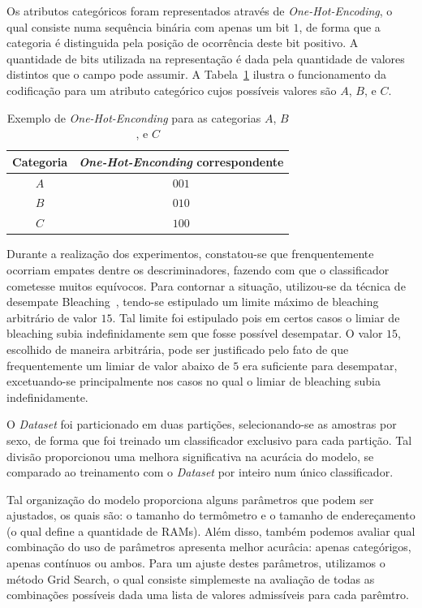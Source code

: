 \documentclass[12pt]{article}
\begin{document}
Os atributos categóricos foram representados através de \emph{One-Hot-Encoding}, o qual consiste numa sequência binária com apenas um bit $1$, de forma que a categoria é distinguida pela posição de ocorrência deste bit positivo. A quantidade de bits utilizada na representação é dada pela quantidade de valores distintos que o campo pode assumir. A Tabela~\ref{tab:onehot} ilustra o funcionamento da codificação para um atributo categórico cujos possíveis valores são $A$, $B$, e $C$.

\begin{table}
\centering
 \begin{tabular}{cc} 
 Categoria & \emph{One-Hot-Enconding} correspondente \\ \hline
 $A$ & $001$ \\
 $B$ & $010$ \\
 $C$ & $100$ \\
 \end{tabular}
  \caption{Exemplo de \emph{One-Hot-Enconding} para as categorias $A$, $B$, e $C$} \label{tab:onehot}
\end{table}

Durante a realização dos experimentos, constatou-se que frenquentemente ocorriam empates dentre os descriminadores, fazendo com que o classificador cometesse muitos equívocos. Para contornar a situação, utilizou-se da técnica de desempate Bleaching~\cite{Grieco:2010:PPE:1751674.1751890}, tendo-se estipulado um limite máximo de bleaching arbitrário de valor $15$. Tal limite foi estipulado pois em certos casos o limiar de bleaching subia indefinidamente sem que fosse possível desempatar. O valor $15$, escolhido de maneira arbitrária, pode ser justificado pelo fato de que frequentemente um limiar de valor abaixo de $5$ era suficiente para desempatar, excetuando-se principalmente nos casos no qual o limiar de bleaching subia indefinidamente.

O \emph{Dataset} foi particionado em duas partições, selecionando-se as amostras por sexo, de forma que foi treinado um classificador exclusivo para cada partição. Tal divisão proporcionou uma melhora significativa na acurácia do modelo, se comparado ao treinamento com o \emph{Dataset} por inteiro num único classificador.

Tal organização do modelo proporciona alguns parâmetros que podem ser ajustados, os quais são: o tamanho do termômetro e o tamanho de endereçamento (o qual define a quantidade de RAMs). Além disso, também podemos avaliar qual combinação do uso de parâmetros apresenta melhor acurâcia: apenas categórigos, apenas contínuos ou ambos. Para um ajuste destes parâmetros, utilizamos o método Grid Search, o qual consiste simplemeste na avaliação de todas as combinações possíveis dada uma lista de valores admissíveis para cada parêmtro.
\end{document}
